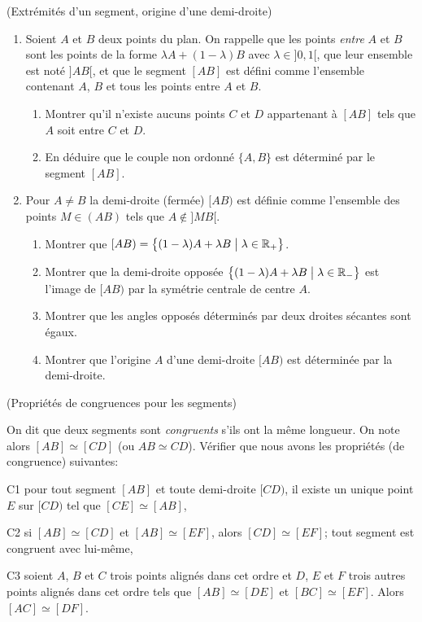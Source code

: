 \documentclass[a4paper,11pt,reqno]{amsart}
\newcommand*{\ensemble}[3][]{#1\{ #2 \;#1|\; #3 #1\}} %
\begin{document}
\begin{exo} (Extrémités d'un segment, origine d'une demi-droite)

  \begin{enumerate}
    \item Soient $A$ et $B$ deux points du plan. On rappelle que les points \emph{entre} $A$ et $B$ sont les points de la forme $\lambda A + (1-\lambda) B$ avec $\lambda \in ]0,1[$, que leur ensemble est noté $]AB[$, et que le segment $[AB]$ est défini comme l'ensemble contenant $A$, $B$ et tous les points entre $A$ et $B$.
    \begin{enumerate}
      \item Montrer qu'il n'existe aucuns points $C$ et $D$ appartenant à $[AB]$ tels que $A$ soit entre $C$ et $D$.
      \item En déduire que le couple non ordonné $\{A,B\}$ est déterminé par le segment $[AB]$.
    \end{enumerate}
    \item Pour $A \neq B$ la demi-droite (fermée) $[AB)$ est définie comme l'ensemble des points $M \in (AB)$ tels que $A \notin ]MB[$.
    \begin{enumerate}
      \item Montrer que $[AB) = \ensemble[\big]{(1- \lambda )A + \lambda B}{\lambda \in \R_{+}}$.
      \item Montrer que la demi-droite opposée $\ensemble[\big]{(1- \lambda )A + \lambda B}{\lambda \in \R_{-}}$ est l'image de $[AB)$ par la symétrie centrale de centre $A$.
      \item Montrer que les angles opposés déterminés par deux droites sécantes sont égaux.
      \item Montrer que l'origine $A$ d'une demi-droite $[AB)$ est déterminée par la demi-droite.
    \end{enumerate}
  \end{enumerate}
\end{exo}

\begin{exo} (Propriétés de congruences pour les segments)

On dit que deux segments sont \emph{congruents} s'ils ont la même longueur. On note alors $[AB]\simeq[CD]$ (ou $AB \simeq CD$). Vérifier que nous avons les propriétés (de congruence) suivantes:
  \begin{axioms}[leftmargin=2.8em]
    \item[C1] pour tout segment $[AB]$ et toute demi-droite $[CD)$, il existe un unique point $E$ sur $[CD)$ tel que $[CE]\simeq[AB]$,
    \item[C2] si $[AB]\simeq[CD]$ et $[AB]\simeq[EF]$, alors $[CD]\simeq[EF]$; tout segment est congruent avec lui-même,
    \item[C3] soient $A$, $B$ et $C$ trois points alignés dans cet ordre et $D$, $E$ et $F$ trois autres points alignés dans cet ordre tels que $[AB]\simeq [DE]$ et $[BC]\simeq[EF]$. Alors $[AC]\simeq[DF]$.
  \end{axioms}
\end{exo}
\end{document}
